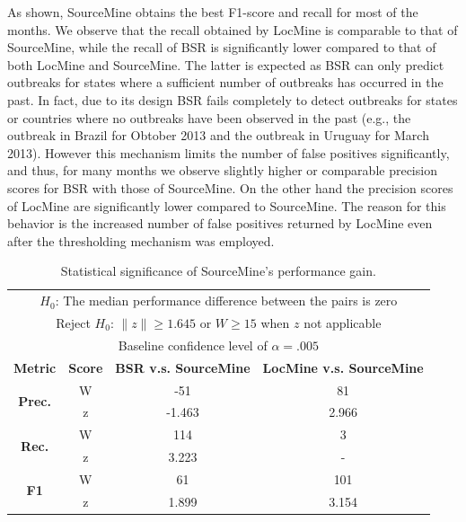 \documentclass[conference]{IEEEtran}
\newcommand{\fullmodel}{{{\sf SourceMine}}\xspace}
\newcommand{\locationmodel}{{\sf LocMine}\xspace}
\begin{document}
As shown, \fullmodel  obtains the best F1-score and recall for most of the months. We observe that the recall obtained by \locationmodel is comparable to that of \fullmodel, while the recall of BSR is significantly lower compared to that of both \locationmodel and \fullmodel. The latter is expected as BSR can only predict outbreaks for states where a sufficient number of outbreaks has occurred in the past. In fact, due to its design BSR fails completely to detect outbreaks for states or countries where no outbreaks have been observed in the past (e.g., the outbreak in Brazil for Obtober 2013 and the outbreak in Uruguay for March 2013).  However this mechanism limits the number of false positives significantly, and thus, for many months we observe slightly higher or comparable precision scores for BSR with those of \fullmodel. On the other hand the precision scores of \locationmodel are significantly lower compared to \fullmodel. The reason for this behavior is the increased number of false positives returned by \locationmodel even after the thresholding mechanism was employed. 

\begin{table}[h]
 \centering
\caption{Statistical significance of \fullmodel's performance gain.}
\begin{tabular}{|c|c|c|c|} 
\multicolumn{4}{c}{$H_0$: The median performance difference between the pairs is zero} \\
\multicolumn{4}{c}{Reject $H_0$: $\|z\| \geq 1.645$ or $W \geq 15$ when $z$ not applicable} \\ 
\multicolumn{4}{c}{Baseline confidence level of $\alpha =.005$} \\ \hline
{\bf Metric} & {\bf Score} & {\bf BSR v.s. \fullmodel} & {\bf \locationmodel v.s. \fullmodel} \\ \hline
\multirow{2}{*}{{\bf Prec.}} & W & -51 & 81\\
& z & -1.463 & 2.966 \\ \hline
\multirow{2}{*}{{\bf Rec.}} & W & 114 & 3\\
& z & 3.223 & -\\ \hline
\multirow{2}{*}{{\bf F1}} & W & 61 & 101\\
& z & 1.899 & 3.154\\ \hline
\end{tabular}
\label{tab:significance}
\end{table}
\end{document}
